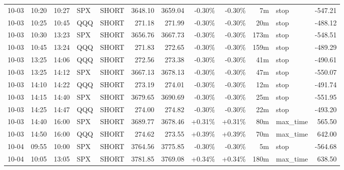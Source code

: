 \documentclass[11pt,a4paper,twoside]{article}
\begin{document}
\begin{center}
\begin{longtable}{>{\color{txtmain}}l l l l l r r r r r >{\color{txtmain}}l r}
10-03 & 10:20 & 10:27 & SPX & SHORT & 3648.10 & 3659.04 & \textcolor{lossred}{-0.30\%} & \textcolor{lossred}{-0.30\%} & 7m & stop & \textcolor{lossred}{-547.21} \\
10-03 & 10:25 & 10:45 & QQQ & SHORT & 271.18 & 271.99 & \textcolor{lossred}{-0.30\%} & \textcolor{lossred}{-0.30\%} & 20m & stop & \textcolor{lossred}{-488.12} \\
10-03 & 10:30 & 13:23 & SPX & SHORT & 3656.76 & 3667.73 & \textcolor{lossred}{-0.30\%} & \textcolor{lossred}{-0.30\%} & 173m & stop & \textcolor{lossred}{-548.51} \\
10-03 & 10:45 & 13:24 & QQQ & SHORT & 271.83 & 272.65 & \textcolor{lossred}{-0.30\%} & \textcolor{lossred}{-0.30\%} & 159m & stop & \textcolor{lossred}{-489.29} \\
10-03 & 13:25 & 14:06 & QQQ & SHORT & 272.56 & 273.38 & \textcolor{lossred}{-0.30\%} & \textcolor{lossred}{-0.30\%} & 41m & stop & \textcolor{lossred}{-490.61} \\
10-03 & 13:25 & 14:12 & SPX & SHORT & 3667.13 & 3678.13 & \textcolor{lossred}{-0.30\%} & \textcolor{lossred}{-0.30\%} & 47m & stop & \textcolor{lossred}{-550.07} \\
10-03 & 14:10 & 14:22 & QQQ & SHORT & 273.19 & 274.01 & \textcolor{lossred}{-0.30\%} & \textcolor{lossred}{-0.30\%} & 12m & stop & \textcolor{lossred}{-491.74} \\
10-03 & 14:15 & 14:40 & SPX & SHORT & 3679.65 & 3690.69 & \textcolor{lossred}{-0.30\%} & \textcolor{lossred}{-0.30\%} & 25m & stop & \textcolor{lossred}{-551.95} \\
10-03 & 14:25 & 14:47 & QQQ & SHORT & 274.00 & 274.82 & \textcolor{lossred}{-0.30\%} & \textcolor{lossred}{-0.30\%} & 22m & stop & \textcolor{lossred}{-493.20} \\
10-03 & 14:40 & 16:00 & SPX & SHORT & 3689.77 & 3678.46 & \textcolor{wingreen}{+0.31\%} & \textcolor{wingreen}{+0.31\%} & 80m & max\_time & \textcolor{wingreen}{565.50} \\
10-03 & 14:50 & 16:00 & QQQ & SHORT & 274.62 & 273.55 & \textcolor{wingreen}{+0.39\%} & \textcolor{wingreen}{+0.39\%} & 70m & max\_time & \textcolor{wingreen}{642.00} \\
10-04 & 09:55 & 10:00 & SPX & SHORT & 3764.56 & 3775.85 & \textcolor{lossred}{-0.30\%} & \textcolor{lossred}{-0.30\%} & 5m & stop & \textcolor{lossred}{-564.68} \\
10-04 & 10:05 & 13:05 & SPX & SHORT & 3781.85 & 3769.08 & \textcolor{wingreen}{+0.34\%} & \textcolor{wingreen}{+0.34\%} & 180m & max\_time & \textcolor{wingreen}{638.50} \\

\end{longtable}
\end{center}
\end{document}
